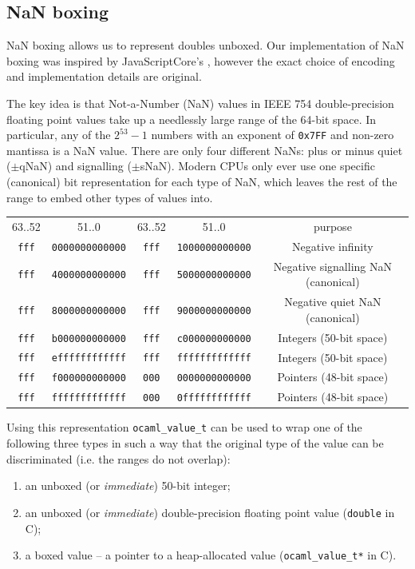 \documentclass[12pt,a4paper,twoside,openright]{report}
\begin{document}
\subsection{NaN boxing}\label{nan-boxing}

NaN boxing allows us to represent doubles unboxed. Our implementation of NaN
boxing was inspired by JavaScriptCore's \cite{jscore}, however the exact choice
of encoding and implementation details are original.

The key idea is that Not-a-Number (NaN) values in IEEE 754 double-precision
floating point values take up a needlessly large range of the 64-bit space. In
particular, any of the $2^{53}-1$ numbers with an exponent of \texttt{0x7FF} and
non-zero mantissa is a NaN value. There are only four different NaNs: plus or
minus quiet ($\pm$qNaN) and signalling ($\pm$sNaN). Modern CPUs only ever use
one specific (canonical) bit representation for each type of NaN, which leaves
the rest of the range to embed other types of values into.

\begin{tabular}{c c | c c | c}
    63..52 & 51..0 & 63..52 & 51..0 & purpose \\
    \lstinline!fff! & \lstinline!0000000000000! & \lstinline!fff! & \lstinline!1000000000000! & Negative infinity \\
    \lstinline!fff! & \lstinline!4000000000000! & \lstinline!fff! & \lstinline!5000000000000! & Negative signalling NaN (canonical) \\
    \lstinline!fff! & \lstinline!8000000000000! & \lstinline!fff! & \lstinline!9000000000000! & Negative quiet NaN (canonical) \\
    \lstinline!fff! & \lstinline!b000000000000! & \lstinline!fff! & \lstinline!c000000000000! & Integers (50-bit space) \\
    \lstinline!fff! & \lstinline!effffffffffff! & \lstinline!fff! & \lstinline!fffffffffffff! & Integers (50-bit space) \\
    \lstinline!fff! & \lstinline!f000000000000! & \lstinline!000! & \lstinline!0000000000000! & Pointers (48-bit space) \\
    \lstinline!fff! & \lstinline!fffffffffffff! & \lstinline!000! & \lstinline!0ffffffffffff! & Pointers (48-bit space)
\end{tabular}

Using this representation \lstinline!ocaml_value_t! can be used to wrap one of the following three types in such a way that the original type of the value can be discriminated (i.e. the ranges do not overlap):
\begin{enumerate}
  \item an unboxed (or \textit{immediate}) 50-bit integer;
  \item an unboxed (or \textit{immediate}) double-precision floating point value (\lstinline!double! in C);
  \item a boxed value -- a pointer to a heap-allocated value (\lstinline!ocaml_value_t*! in C).
\end{enumerate}
\end{document}
